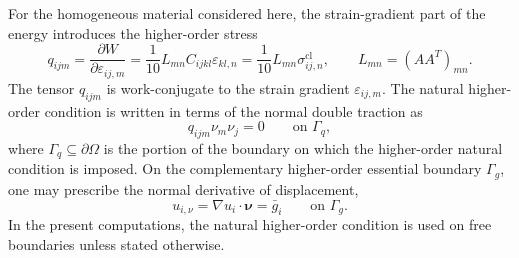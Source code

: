 \documentclass[final,3p,times,fleqn]{elsarticle}
\begin{document}
For the homogeneous material considered here, the strain-gradient part of
the energy introduces the higher-order stress
\begin{equation}\label{eq:higher_order_stress}
q_{ijm}
=
\frac{\partial W}{\partial \varepsilon_{ij,m}}
=
\frac{1}{10}
L_{mn}C_{ijkl}\varepsilon_{kl,n}
=
\frac{1}{10}
L_{mn}\sigma_{ij,n}^{\mathrm{cl}},
\qquad
L_{mn}=(AA^T)_{mn}.
\end{equation}
The tensor $q_{ijm}$ is work-conjugate to the strain gradient
$\varepsilon_{ij,m}$. The natural higher-order condition is written in
terms of the normal double traction as
\begin{equation}\label{eq:double_traction_BC}
q_{ijm}\nu_m\nu_j=0
\qquad
\text{on } \Gamma_q ,
\end{equation}
where $\Gamma_q\subseteq\partial\Omega$ is the portion of the boundary
on which the higher-order natural condition is imposed. On the
complementary higher-order essential boundary $\Gamma_g$, one may
prescribe the normal derivative of displacement,
\begin{equation}\label{eq:higher_order_essential_BC}
u_{i,\nu}
=
\nabla u_i\cdot\boldsymbol{\nu}
=
\bar{g}_i
\qquad
\text{on } \Gamma_g .
\end{equation}
In the present computations, the natural higher-order condition is used
on free boundaries unless stated otherwise.
\end{document}
